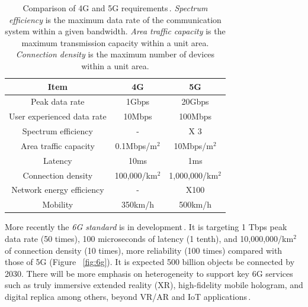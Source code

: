 \documentclass[11pt]{article}
\begin{document}
\begin{table}[h!]
\begin{center}
\begin{tabular}{ |c|c|c| } 
\hline
Item & 4G & 5G \\\hline\hline
Peak data rate & 1Gbps & 20Gbps \\\hline
User experienced data rate & 10Mbps & 100Mbps \\\hline
Spectrum efficiency & - & X 3 \\\hline
Area traffic capacity & 0.1Mbps/m$^2$ & 10Mbps/m$^2$ \\\hline
Latency & 10ms & 1ms \\\hline
Connection density & 100,000/km$^2$ & 1,000,000/km$^2$ \\\hline
Network energy efficiency & - & X100 \\\hline
Mobility & 350km/h & 500km/h \\
\hline
\end{tabular}
\end{center}
\caption{Comparison of 4G and 5G requirements\,\cite{samsung2018}. \emph{Spectrum efficiency} is the maximum data rate of the communication system within a given bandwidth. \emph{Area traffic capacity} is the maximum transmission capacity within a unit area. \emph{Connection density} is the maximum number of devices within a unit area.}
\label{tab:4G_5G_comparison}
\end{table}

More recently the \emph{6G standard} is in development\,\cite{6g}. It is targeting 1 Tbps peak data rate (50 times), 100 microseconds of latency (1 tenth), and 10,000,000/km$^2$ of connection density (10 times), more reliability (100 times) compared with those of 5G (Figure ~\ref{fig:6g}). It is expected 500 billion objects be connected by 2030. There will be more emphasis on heterogeneity to support key 6G services such as truly immersive extended reality (XR), high-fidelity mobile hologram, and digital replica among others, beyond VR/AR and IoT applications\,\cite{samsungwhitepaper}.
\end{document}
